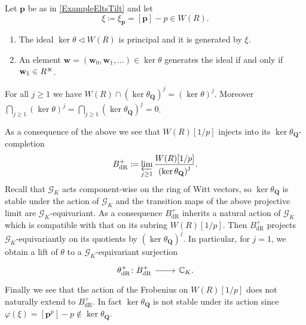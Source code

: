 \begin{prop}
	Let $\mathbf{p}$ be as in \cref{ExampleEltsTilt} and let
	\begin{equation*}
		\xi \coloneqq \xi_{\mathbf{p}} = [\mathbf{p}] - p \in W(R)
	.\end{equation*}
\begin{enumerate}
	\item The ideal $\ker \theta \triangleleft W(R)$ is principal and it is generated
		by $\xi$.
	\item An element $\mathbf{w} = (\mathbf{w}_0, \mathbf{w}_1, \ldots) \in \ker\theta$ generates
		the ideal if and only if $\mathbf{w}_1 \in R^{\cross}$.
\end{enumerate}
\end{prop}


\begin{cor}
	For all $j \geq 1$ we have $W(R) \cap \left( \ker \theta_{\mathbf{Q}} \right)^j =
	\left( \ker \theta \right)^j$.
	Moreover $\bigcap_{j \geq 1} \left( \ker \theta \right)^j =
	\bigcap_{j \geq 1} \left( \ker \theta_{\mathbf{Q}} \right)^j = 0$.
\end{cor} 


\begin{rem}[]\label{kerQGKStable}
	As a consequence of the above we see that $W(R)[1/p]$
	injects into its $\ker \theta_{\mathbf{Q}}$-completion
	\begin{equation*}
	B^+_{\mathrm{dR}} \coloneqq \varprojlim_{j \geq 1}
	\frac{ W(R)[1/p] }{ \left( \ker \theta_{\mathbf{Q}} \right)^j }
	.\end{equation*}
	Recall that $\mathscr{G}_K$ acts component-wise on the ring of Witt vectors,
	so $\ker \theta_{\mathbf{Q}}$ is stable under the action of $\mathscr{G}_K$
	and the transition maps of the above projective limit are $\mathscr{G}_K$-equivariant.
	As a consequence $B^+_{\mathrm{dR}}$ inherits a natural action of $\mathscr{G}_K$
	which is compatible with that on its subring $W(R)[1/p]$.
	Then $B^+_{\mathrm{dR}}$ projects $\mathscr{G}_K$-equivariantly on its quotients
	by $\left( \ker \theta_{\mathbf{Q}} \right)^j$.
	In particular, for $j = 1$, we obtain a lift of $\theta$ 
	to a $\mathscr{G}_K$-equivariant surjection
	\begin{equation*}
	\begin{tikzcd}[row sep = 0ex
		,/tikz/column 1/.append style={anchor=base east}
		,/tikz/column 2/.append style={anchor=base west}]
		\theta^+_{\mathrm{dR}}\colon B^+_{\mathrm{dR}} \arrow[r, "", rightarrow] &
		\mathbb{C}_K
	.\end{tikzcd}
	\end{equation*} 
	Finally we see that the action of the Frobenius on $W(R)[1/p]$
	does not naturally extend to $B^+_{\mathrm{dR}}$.
	In fact $\ker \theta_{\mathbf{Q}}$ is not stable under its action
	since $\varphi(\xi) = [\mathbf{p}^p] - p \notin \ker \theta_{\mathbf{Q}}$.
\end{rem}


